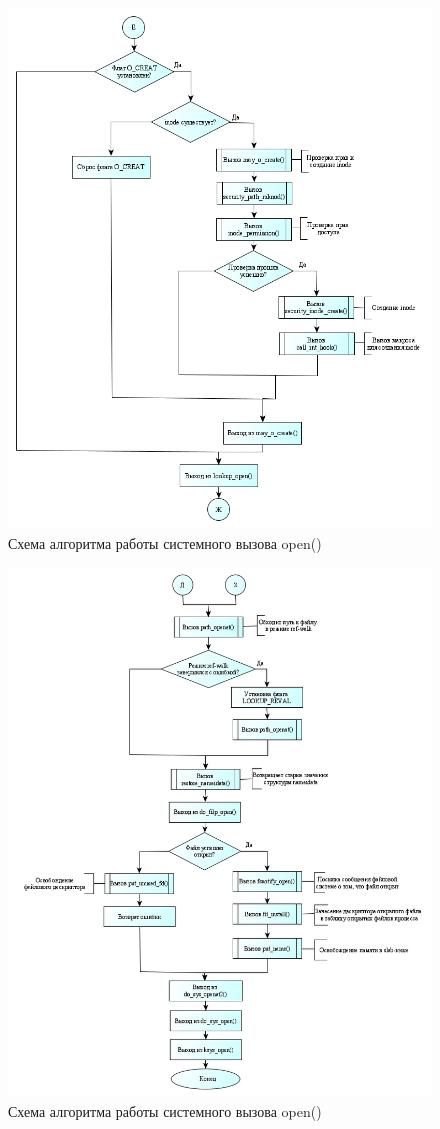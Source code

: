 \begin{figure}[h!]
	\caption{Схема алгоритма работы системного вызова open()}
	\center\includegraphics[scale=0.65]{img/41.jpg}
	
\end{figure}
\begin{figure}[h!]
	\caption{Схема алгоритма работы системного вызова open()}
	\center\includegraphics[scale=0.65]{img/5.jpg}
	
\end{figure}